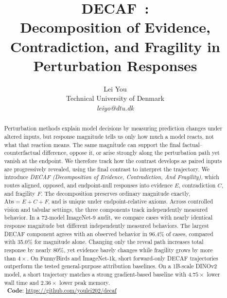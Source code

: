 \documentclass{article}
\title{DECAF~{\large \texorpdfstring{\faCoffee}{[Coffee]}}: \\
\textbf{D}ecomposition of \textbf{E}vidence, \textbf{C}ontradiction, \textbf{a}nd \textbf{F}ragility in Perturbation Responses}
\author{Lei You \\ Technical University of Denmark \\ \textit{leiyo@dtu.dk}}
\newcommand{\decaf}{\textsc{DECAF}\xspace}
\newcommand{\Abs}{\mathrm{Abs}}
\theoremstyle{remark}
\begin{document}
\maketitle


\begin{abstract}
Perturbation methods explain model decisions by measuring prediction changes
under altered inputs, but response magnitude tells us only how much a model
reacts, not what that reaction means. The same magnitude can support the final
factual--counterfactual difference, oppose it, or arise strongly along the
perturbation path yet vanish at the endpoint. We therefore track how the
contrast develops as paired inputs are progressively revealed, using the final
contrast to interpret the trajectory.
We introduce \emph{\decaf
(\textsc{D}ecomposition of \textsc{E}vidence,
\textsc{C}ontradiction, \textsc{A}nd \textsc{F}ragility)}, which routes aligned,
opposed, and endpoint-null responses into evidence $E$, contradiction $C$, and
fragility $F$. The decomposition preserves ordinary magnitude exactly,
$\Abs=E+C+F$, and is unique under endpoint-relative axioms.
Across controlled vision and tabular settings, the three components track
independently measured behavior. In a 72-model ImageNet-9 audit, we compare
cases with nearly identical response magnitude but different independently
measured behaviors. The largest \decaf component agrees with an observed
behavior in 96.4\% of cases, compared with 35.0\% for magnitude alone.
Changing only the reveal path increases total response by nearly 80\%, yet
evidence barely changes while fragility grows by more than $4\times$.
On FunnyBirds and ImageNet-1k, short forward-only \decaf trajectories outperform
the tested general-purpose attribution baselines. On a 1B-scale DINOv2 model,
a short trajectory matches a strong gradient-based baseline with $4.75\times$
lower wall time and $2.36\times$ lower peak memory. \\[2mm]
\faGithub~\textbf{Code}: {\small \url{https://github.com/youlei202/decaf}}

\end{abstract}








% 

\end{document}

